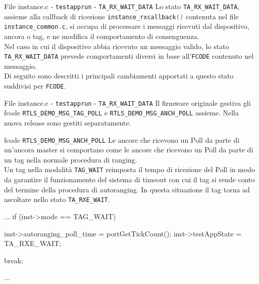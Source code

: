 \begin{frame}{File instance.c - \lstinline[language=C]!testapprun! - \lstinline[language=C]!TA_RX_WAIT_DATA!}
  Lo stato \lstinline[language=C]!TA_RX_WAIT_DATA!, assieme alla callback di ricezione \lstinline[language=C]!instance_rxcallback()!
  contenuta nel file \lstinline[language=C]!instance_common.c!, si occupa di processare i messaggi ricevuti dal dispositivo,
  ancora o tag, e ne modifica il comportamento di consenguenza.\\
  Nel caso in cui il dispositivo abbia ricevuto un messaggio valido, lo stato \lstinline[language=C]!TA_RX_WAIT_DATA!
  prevede comportamenti diversi in base all'\lstinline[language=C]!FCODE! contenuto nel messaggio.\\
  Di seguito sono descritti i principali \alert{cambiamenti} apportati a questo stato suddivisi
  per \lstinline[language=C]!FCODE!.
\end{frame}

\begin{frame}[fragile, shrink=30]{File instance.c - \lstinline[language=C]!testapprun! - \lstinline[language=C]!TA_RX_WAIT_DATA!}
  Il firmware originale gestiva gli fcode \lstinline[language=C]!RTLS_DEMO_MSG_TAG_POLL! e
  \lstinline[language=C]!RTLS_DEMO_MSG_ANCH_POLL! assieme. Nella nuova release sono gestiti separatamente.
  \begin{block}{fcode \lstinline[language=C]!RTLS_DEMO_MSG_ANCH_POLL!}
    Le ancore che ricevono un Poll da parte di un'ancora master si comportano come le ancore
    che ricevono un Poll da parte di un tag nella normale procedura di ranging.\\
    Un tag nella modalità \lstinline[language=C]!TAG_WAIT! reimposta il tempo di ricezione del Poll in modo
    da garantire il funzionamento del sistema di timeout con cui il tag si rende conto del termine
    della procedura di autoranging. In questa situazione il tag torna ad ascoltare nello stato
    \lstinline[language=C]!TA_RXE_WAIT!.
    \begin{C}
      ...
      if (inst->mode == TAG_WAIT)
      {
        inst->autoranging_poll_time = portGetTickCount();
        inst->testAppState = TA_RXE_WAIT;

        break;
      }
      ...
    \end{C}
  \end{block}
\end{frame}

